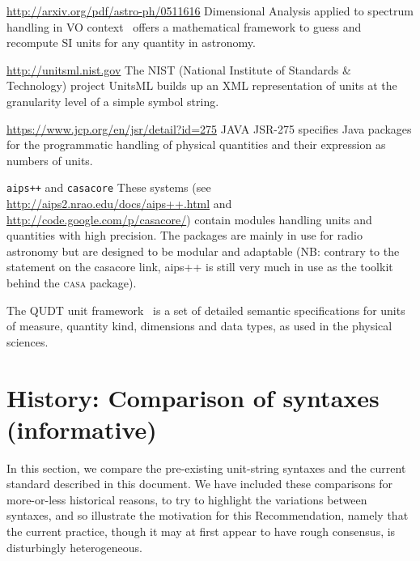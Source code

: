 \documentclass[11pt,a4paper]{ivoa}
\newcommand{\violet}{\textcolor[rgb]{0.50,0.00,0.50}}
\begin{document}
\begin{bigdescription}
\item[\url{http://arxiv.org/pdf/astro-ph/0511616}]
Dimensional Analysis applied to spectrum handling in VO context~\citep{osuna05}
offers a mathematical framework to guess and recompute
SI units for any quantity in astronomy.

\item[\url{http://unitsml.nist.gov}]
The NIST (National Institute of Standards \& Technology) project
UnitsML builds up an XML representation of units at the granularity
level of a simple symbol string.

\item[\url{https://www.jcp.org/en/jsr/detail?id=275}]
JAVA JSR-275 specifies Java packages for the programmatic
handling of physical quantities and their expression as numbers of
units.
\item[\texttt{aips++} and \texttt{casacore}]
These systems (see \url{http://aips2.nrao.edu/docs/aips++.html} and
 \url{http://code.google.com/p/casacore/}) contain modules handling
 units and quantities with high precision. The packages are mainly in use for
radio astronomy but are designed to be modular and adaptable (NB:
contrary to the statement on the casacore link, aips++ is still very much in
use as the toolkit behind the \textsc{casa} package).
\item The QUDT unit framework~\citep{qudt} is a set of detailed
  semantic specifications for units of measure, quantity kind,
  dimensions and data types, as used in the physical sciences.
\end{bigdescription}
\clearpage
\section{History: Comparison of syntaxes (informative)\label{appx:comparisons}}

In this section, we compare the pre-existing unit-string syntaxes and the
current standard described in this document.
We have included these comparisons for
more-or-less historical reasons, to try to highlight the variations
between syntaxes, and so illustrate the motivation for this
Recommendation, namely that the current practice, though it may at
first appear to have rough consensus, is disturbingly heterogeneous.
\end{document}
